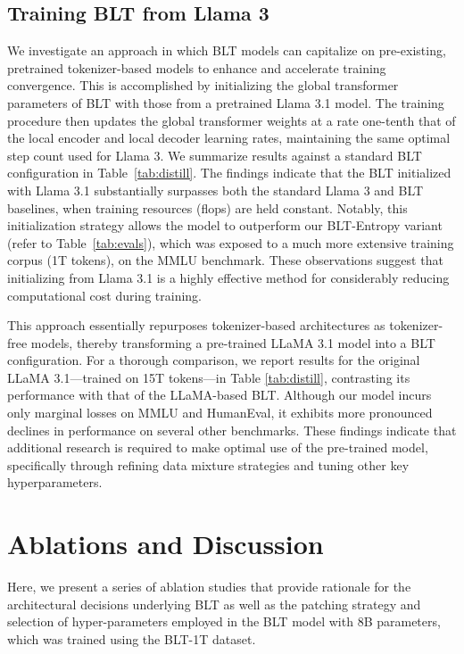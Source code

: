\subsection{Training {\textsc BLT} from Llama 3}
\label{sec:distillation}
We investigate an approach in which {\textsc BLT} models can capitalize on pre-existing, pretrained tokenizer-based models to enhance and accelerate training convergence. This is accomplished by initializing the global transformer parameters of {\textsc BLT} with those from a pretrained Llama 3.1 model. The training procedure then updates the global transformer weights at a rate one-tenth that of the local encoder and local decoder learning rates, maintaining the same optimal step count used for Llama 3. We summarize results against a standard {\textsc BLT} configuration in Table~\ref{tab:distill}. The findings indicate that the {\textsc BLT} initialized with Llama 3.1 substantially surpasses both the standard Llama 3 and {\textsc BLT} baselines, when training resources (flops) are held constant. Notably, this initialization strategy allows the model to outperform our {\textsc BLT}-Entropy variant (refer to Table~\ref{tab:evals}), which was exposed to a much more extensive training corpus (1T tokens), on the MMLU benchmark. These observations suggest that initializing from Llama 3.1 is a highly effective method for considerably reducing computational cost during training.

This approach essentially repurposes tokenizer-based architectures as tokenizer-free models, thereby transforming a pre-trained LLaMA 3.1 model into a {\textsc BLT} configuration. For a thorough comparison, we report results for the original LLaMA 3.1—trained on 15T tokens—in Table \ref{tab:distill}, contrasting its performance with that of the LLaMA-based {\textsc BLT}. Although our model incurs only marginal losses on MMLU and HumanEval, it exhibits more pronounced declines in performance on several other benchmarks. These findings indicate that additional research is required to make optimal use of the pre-trained model, specifically through refining data mixture strategies and tuning other key hyperparameters.

\section{Ablations and Discussion}
\label{section:ablations}
Here, we present a series of ablation studies that provide rationale for the architectural decisions underlying {\textsc BLT} as well as the patching strategy and selection of hyper-parameters employed in the {\textsc BLT} model with 8B parameters, which was trained using the {\textsc BLT}-1T dataset.

